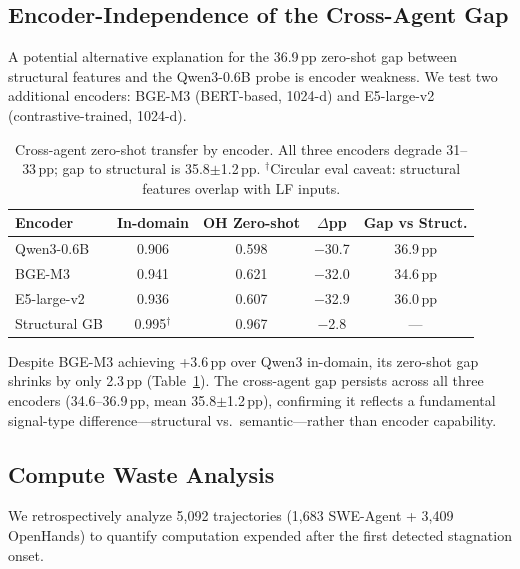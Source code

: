 \documentclass[11pt,a4paper]{article}
\begin{document}
\subsection{Encoder-Independence of the Cross-Agent Gap}
\label{sec:encoder}

A potential alternative explanation for the 36.9\,pp zero-shot gap between structural features and the Qwen3-0.6B probe is encoder weakness.
We test two additional encoders: BGE-M3 (BERT-based, 1024-d) and E5-large-v2 (contrastive-trained, 1024-d).

\begin{table}[t]
\centering
\small
\begin{tabular}{lcccc}
\toprule
\textbf{Encoder} & \textbf{In-domain} & \textbf{OH Zero-shot} & \textbf{$\Delta$pp} & \textbf{Gap vs Struct.} \\
\midrule
Qwen3-0.6B & 0.906 & 0.598 & $-$30.7 & 36.9\,pp \\
BGE-M3 & 0.941 & 0.621 & $-$32.0 & 34.6\,pp \\
E5-large-v2 & 0.936 & 0.607 & $-$32.9 & 36.0\,pp \\
\midrule
Structural GB & 0.995$^\dagger$ & 0.967 & $-$2.8 & --- \\
\bottomrule
\end{tabular}
\caption{Cross-agent zero-shot transfer by encoder. All three encoders degrade 31--33\,pp; gap to structural is 35.8$\pm$1.2\,pp. $^\dagger$Circular eval caveat: structural features overlap with LF inputs.}
\label{tab:encoder}
\end{table}

Despite BGE-M3 achieving +3.6\,pp over Qwen3 in-domain, its zero-shot gap shrinks by only 2.3\,pp (Table~\ref{tab:encoder}).
The cross-agent gap persists across all three encoders (34.6--36.9\,pp, mean 35.8$\pm$1.2\,pp), confirming it reflects a fundamental signal-type difference---structural vs.\ semantic---rather than encoder capability.

\subsection{Compute Waste Analysis}
\label{sec:waste}

We retrospectively analyze 5{,}092 trajectories (1{,}683 SWE-Agent + 3{,}409 OpenHands) to quantify computation expended after the first detected stagnation onset.
\end{document}
